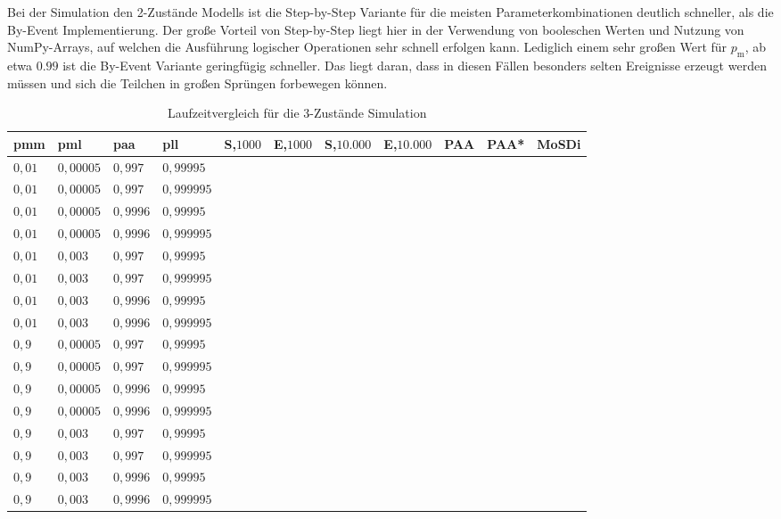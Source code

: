Bei der Simulation den 2-Zustände Modells ist die Step-by-Step Variante für die meisten Parameterkombinationen deutlich schneller, als die By-Event Implementierung. Der große Vorteil von Step-by-Step liegt hier in der Verwendung von booleschen Werten und Nutzung von NumPy-Arrays, auf welchen die Ausführung logischer Operationen sehr schnell erfolgen kann. Lediglich einem sehr großen Wert für $p_{\text{m}}$, ab etwa $0.99$ ist die By-Event Variante geringfügig schneller. Das liegt daran, dass in diesen Fällen besonders selten Ereignisse erzeugt werden müssen und sich die Teilchen in großen Sprüngen forbewegen können. 


\begin{table}[h]
\centering
\caption{Laufzeitvergleich für die 3-Zustände Simulation}
\label{3s_laufzeit}
\begin{tabular}{|l|l|l|l||l|l|l|l|l|l|l|}
\hline
pmm & pml & paa & pll & S,$1000$ & E,$1000$ & S,$10.000$ & E,$10.000$ & PAA & PAA* & MoSDi \\ \hline \hline
$ 0,01 $ & $0,00005$ & $0,997$  & $0,99995$  & $ $ & $ $ & $ $ & $ $ & $ $ & $ $ & $ $ \\ \hline
$ 0,01 $ & $0,00005$ & $0,997$  & $0,999995$ & $ $ & $ $ & $ $ & $ $ & $ $ & $ $ & $ $ \\ \hline
$ 0,01 $ & $0,00005$ & $0,9996$ & $0,99995$  & $ $ & $ $ & $ $ & $ $ & $ $ & $ $ & $ $ \\ \hline
$ 0,01 $ & $0,00005$ & $0,9996$ & $0,999995$ & $ $ & $ $ & $ $ & $ $ & $ $ & $ $ & $ $ \\ \hline
$ 0,01 $ & $0,003 $  & $0,997$  & $0,99995$  & $ $ & $ $ & $ $ & $ $ & $ $ & $ $ & $ $ \\ \hline
$ 0,01 $ & $0,003 $  & $0,997$  & $0,999995$ & $ $ & $ $ & $ $ & $ $ & $ $ & $ $ & $ $ \\ \hline
$ 0,01 $ & $0,003 $  & $0,9996$ & $0,99995$  & $ $ & $ $ & $ $ & $ $ & $ $ & $ $ & $ $ \\ \hline
$ 0,01 $ & $0,003 $  & $0,9996$ & $0,999995$ & $ $ & $ $ & $ $ & $ $ & $ $ & $ $ & $ $ \\ \hline
$ 0,9  $ & $0,00005$ & $0,997$  & $0,99995$  & $ $ & $ $ & $ $ & $ $ & $ $ & $ $ & $ $ \\ \hline
$ 0,9  $ & $0,00005$ & $0,997$  & $0,999995$ & $ $ & $ $ & $ $ & $ $ & $ $ & $ $ & $ $ \\ \hline
$ 0,9  $ & $0,00005$ & $0,9996$ & $0,99995$  & $ $ & $ $ & $ $ & $ $ & $ $ & $ $ & $ $ \\ \hline
$ 0,9  $ & $0,00005$ & $0,9996$ & $0,999995$ & $ $ & $ $ & $ $ & $ $ & $ $ & $ $ & $ $ \\ \hline
$ 0,9  $ & $0,003 $  & $0,997$  & $0,99995$  & $ $ & $ $ & $ $ & $ $ & $ $ & $ $ & $ $ \\ \hline
$ 0,9  $ & $0,003 $  & $0,997$  & $0,999995$ & $ $ & $ $ & $ $ & $ $ & $ $ & $ $ & $ $ \\ \hline
$ 0,9  $ & $0,003 $  & $0,9996$ & $0,99995$  & $ $ & $ $ & $ $ & $ $ & $ $ & $ $ & $ $ \\ \hline
$ 0,9  $ & $0,003 $  & $0,9996$ & $0,999995$ & $ $ & $ $ & $ $ & $ $ & $ $ & $ $ & $ $ \\ \hline
\end{tabular}
\end{table}
